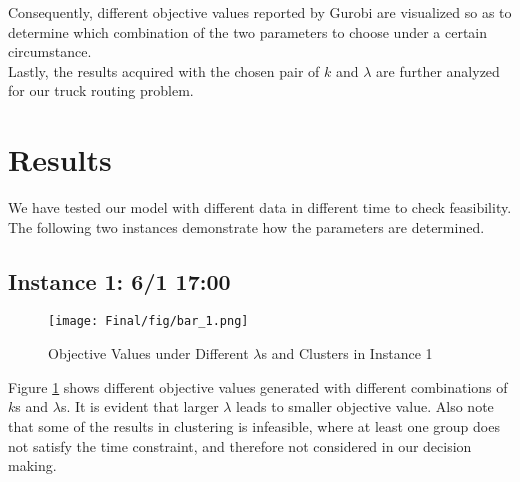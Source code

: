 \documentclass[a4paper, 12pt]{article}%
\theoremstyle{definition}
\begin{document}
\noindent Consequently, different objective values reported by Gurobi are visualized so as to determine which combination of the two parameters to choose under a certain circumstance. \\

\noindent Lastly, the results acquired with the chosen pair of $k$ and $\lambda$ are further analyzed for our truck routing problem.



\section{Results}

\noindent We have tested our model with different data in different time to check feasibility. The following two instances demonstrate how the parameters are determined. 

\subsection{Instance 1: 6/1 17:00}





\begin{figure}[hbt]
    \centering
    \texttt{[image: Final/fig/bar\_1.png]}
    \caption{Objective Values under Different $\lambda$s and Clusters in Instance 1}
    \label{fig:bar-1}
\end{figure}

\noindent Figure \ref{fig:bar-1} shows different objective values generated with different combinations of $k$s and $\lambda$s. It is evident that larger $\lambda$  leads to smaller objective value. Also note that some of the results in clustering is infeasible, where at least one group does not satisfy the time constraint, and therefore not considered in our decision making.\\ 
\end{document}
